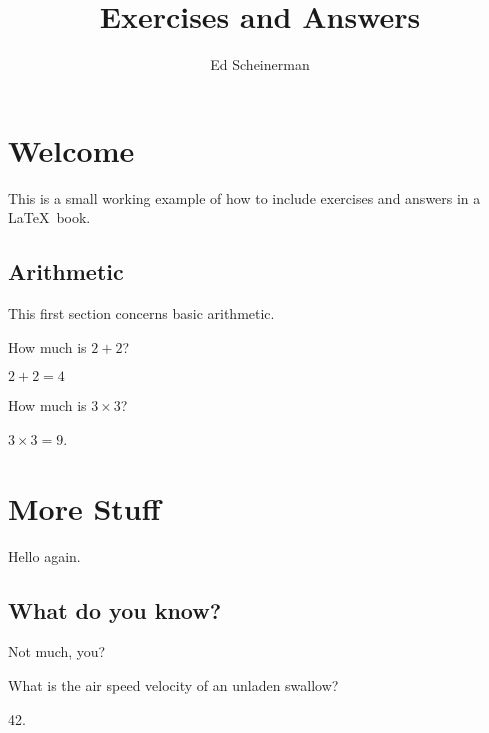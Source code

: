 \documentclass{book}
\title{Exercises and Answers}
\author{Ed Scheinerman}
\date{}
\begin{document}
\maketitle

\tableofcontents

\mainmatter

\chapter{Welcome}
This is a small working example of how to include exercises and
answers in a \LaTeX\ book. 

\section{Arithmetic}

This first section concerns basic arithmetic.

\begin{exercises}

\item How much is $2+2$?
  \begin{answer}
    $2+2= 4$ 
  \end{answer}


\item How much is $3\times 3$? 
  \begin{answer}
    $3\times3 = 9$. 
  \end{answer}
\end{exercises}


\chapter{More Stuff}

Hello again.

\section{What do you know?}

Not much, you?

\begin{exercises}
\item What is the air speed velocity of an unladen swallow?

  \begin{answer}
    42.
  \end{answer}
\end{exercises}



\CloseMagicAnswerFile


\backmatter

% 


\answers
\end{document}
